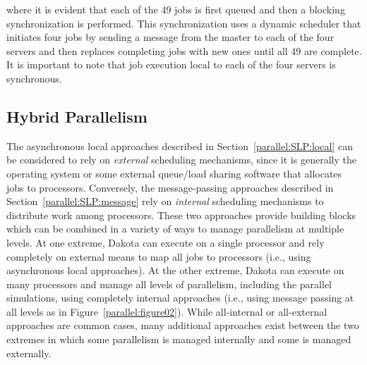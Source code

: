 where it is evident that each of the 49 jobs is first queued and then
a blocking synchronization is performed.  This synchronization uses a
dynamic scheduler that initiates four jobs by sending a message from
the master to each of the four servers and then replaces completing
jobs with new ones until all 49 are complete.  It is important to note
that job execution local to each of the four servers is synchronous.


\subsection{Hybrid Parallelism}\label{parallel:SLP:hybrid}

The asynchronous local approaches described in
Section~\ref{parallel:SLP:local} can be considered to rely on
\emph{external} scheduling mechanisms, since it is generally the
operating system or some external queue/load sharing software that
allocates jobs to processors. Conversely, the message-passing
approaches described in Section~\ref{parallel:SLP:message} rely on
\emph{internal} scheduling mechanisms to distribute work among
processors. These two approaches provide building blocks which can be
combined in a variety of ways to manage parallelism at multiple
levels. At one extreme, Dakota can execute on a single processor and
rely completely on external means to map all jobs to processors (i.e.,
using asynchronous local approaches). At the other extreme, Dakota can
execute on many processors and manage all levels of parallelism,
including the parallel simulations, using completely internal
approaches (i.e., using message passing at all levels as in
Figure~\ref{parallel:figure02}). While all-internal or all-external
approaches are common cases, many additional approaches exist between
the two extremes in which some parallelism is managed internally and
some is managed externally.

